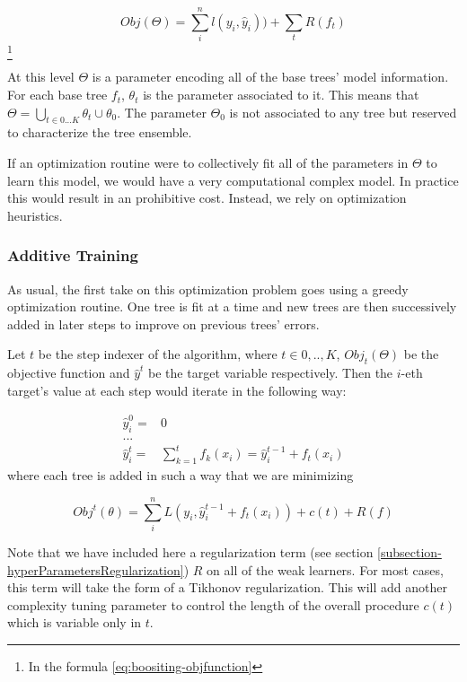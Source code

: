 \[ Obj(\Theta) = \sum_i^n l(y_i,\hat{y}_i))  +  \sum_t R(f_t) \] \label{eq:boositing-objfunction} \footnote{In the formula \ref{eq:boositing-objfunction} }
%    

At this level $\Theta$ is a parameter encoding all of the base trees' model information. For each base tree $f_t$, $\theta_t$ is the parameter associated to it. This means that $\Theta =  \bigcup_{t \in {0...K}} \theta_t  \cup \theta_0$.  The parameter $\Theta_0$ is not associated to any tree but reserved to characterize the tree ensemble. 

If an optimization routine were to collectively fit all of the parameters in $\Theta$ to learn this model, we would have a very computational complex model. In practice this would result in an prohibitive cost. Instead, we rely on optimization heuristics. 

\subsubsection{Additive Training}

As usual, the first take on this optimization problem goes using a greedy optimization routine. One tree is fit at a time and new trees are then successively added in later steps to improve on previous trees' errors.

Let $t$ be the step indexer of the algorithm, where $t \in {0,..,K}$, $Obj_t(\Theta)$ be the objective function and $\hat{y}^t$ be the target variable respectively. Then the $i$-eth target's value at each step would iterate in the following way:

\begin{equation} \label{eq:gb-targetSteps}
\begin{split}
\hat{y}_i^0 = & 0 \\
... \\ 
\hat{y}_i^t = &\sum_{k=1}^{t} f_k(x_i) = \hat{y}^{t-1}_i +  f_t(x_i)
\end{split}
\end{equation}
where each tree is added in such a way that we are minimizing

\begin{equation}
Obj^t(\theta) =  \sum_i^n L(y_i, \hat{y}^{t-1}_i +  f_t(x_i) ) + c(t) + R(f) 
\end{equation}


Note that we have included here a regularization term (see section \ref{subsection-hyperParametersRegularization}) $R$ on all of the weak learners. For most cases,  this term will take the form of a Tikhonov regularization. This will add another complexity tuning parameter to control the length of the overall procedure $c(t)$ which is variable only in $t$. 

